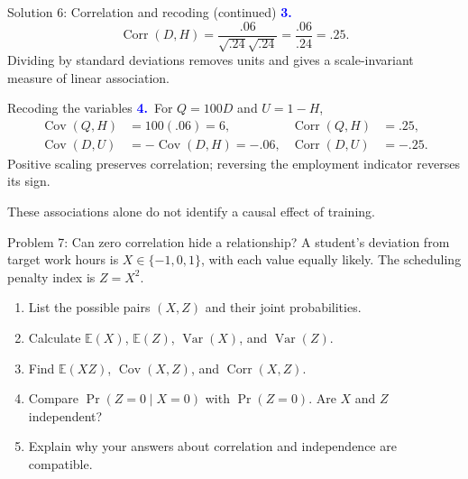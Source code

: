 \documentclass[notes,10pt, aspectratio=169]{beamer}
\newcommand{\E}{\mathbb{E}}
\newcommand{\Var}{\operatorname{Var}}
\newcommand{\Cov}{\operatorname{Cov}}
\newcommand{\Corr}{\operatorname{Corr}}
\newcommand{\answerpart}[1]{\textcolor{blue}{\textbf{#1.}}\,}
\begin{document}
\begin{frame}{Solution 6: Correlation and recoding (continued)}
\small
\answerpart{3}
\[
\Corr(D,H)=\frac{.06}{\sqrt{.24}\sqrt{.24}}=\frac{.06}{.24}=\boxed{.25}.
\]
Dividing by standard deviations removes units and gives a scale-invariant measure of linear association.
\begin{block}{Recoding the variables}
\answerpart{4}
For $Q=100D$ and $U=1-H$,
\begin{align*}
\Cov(Q,H)&=100(.06)=6, &\Corr(Q,H)&=.25,\\
\Cov(D,U)&=-\Cov(D,H)=-.06, &\Corr(D,U)&=-.25.
\end{align*}
Positive scaling preserves correlation; reversing the employment indicator reverses its sign.
\end{block}
These associations alone do not identify a causal effect of training.
\end{frame}
\fi

\begin{frame}{Problem 7: Can zero correlation hide a relationship?}
A student's deviation from target work hours is $X\in\{-1,0,1\}$, with each value equally likely. The scheduling penalty index is $Z=X^2$.
\begin{enumerate}
\setlength{\itemsep}{8pt}
\item List the possible pairs $(X,Z)$ and their joint probabilities.
\item Calculate $\E(X)$, $\E(Z)$, $\Var(X)$, and $\Var(Z)$.
\item Find $\E(XZ)$, $\Cov(X,Z)$, and $\Corr(X,Z)$.
\item Compare $\Pr(Z=0\mid X=0)$ with $\Pr(Z=0)$. Are $X$ and $Z$ independent?
\item Explain why your answers about correlation and independence are compatible.
\end{enumerate}
\end{frame}
\end{document}

